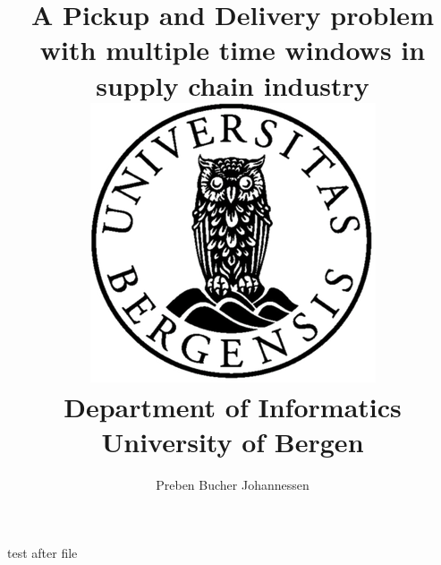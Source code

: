 \documentclass[12pt,twoside]{report}
\title{{A Pickup and Delivery problem with multiple time windows in supply chain industry}\\
{\includegraphics{uib_2.png}}\\
{\large Department of Informatics}\\
{\large University of Bergen}\\
}
\author{Preben Bucher Johannessen}
\def\biblio{}
\begin{document}
\maketitle
\def\biblio{}




\tableofcontents{}

\listoffigures{}




test after file











\appendix




\end{document}
